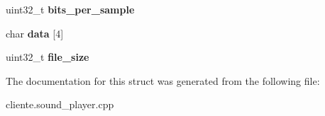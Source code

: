 \begin{DoxyCompactItemize}
\item 
\hypertarget{structTWavHeader_aa463a443f52fb3f2cc2f249ddf046063}{uint32\-\_\-t {\bfseries bits\-\_\-per\-\_\-sample}}\label{structTWavHeader_aa463a443f52fb3f2cc2f249ddf046063}

\item 
\hypertarget{structTWavHeader_adce8403001ab3f9e0e8c9b133b81e054}{char {\bfseries data} \mbox{[}4\mbox{]}}\label{structTWavHeader_adce8403001ab3f9e0e8c9b133b81e054}

\item 
\hypertarget{structTWavHeader_a72fbdd2ccca8b4d729b404e280a31684}{uint32\-\_\-t {\bfseries file\-\_\-size}}\label{structTWavHeader_a72fbdd2ccca8b4d729b404e280a31684}

\end{DoxyCompactItemize}


The documentation for this struct was generated from the following file\-:\begin{DoxyCompactItemize}
\item 
cliente.\-sound\-\_\-player.\-cpp\end{DoxyCompactItemize}
